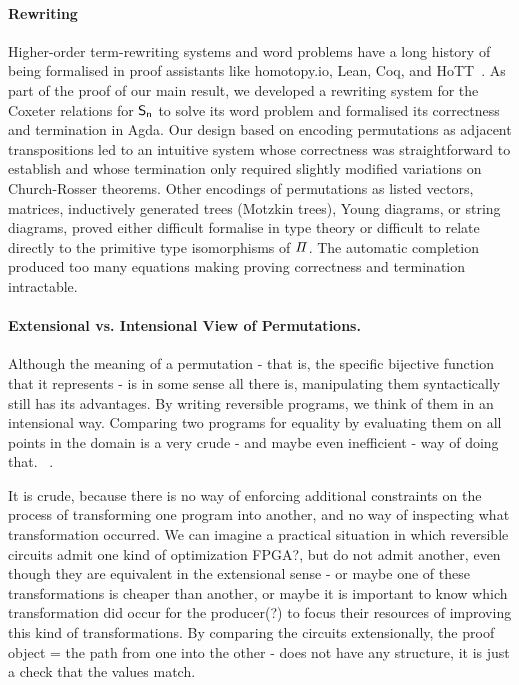 \paragraph{Rewriting} Higher-order term-rewriting systems and word problems have a long history of being formalised in
proof assistants like {homotopy.io}, Lean, Coq, and HoTT~\cite{krausCoherenceWellFoundednessTaming2020}. As part of the
proof of our main result, we developed a rewriting system for the Coxeter relations for $\Sn$ to solve its word problem
and formalised its correctness and termination in Agda. Our design based on encoding permutations as
adjacent transpositions led to an intuitive system whose correctness was straightforward to establish and whose termination
only required slightly modified variations on Church-Rosser theorems. Other encodings of permutations as listed vectors,
matrices, inductively generated trees (Motzkin trees), Young diagrams, or string diagrams, proved either difficult
formalise in type theory or difficult to relate directly to the primitive type isomorphisms of $\mathit{\Pi}$. The automatic
\citet{knuthSimpleWordProblems1970} completion produced too many equations making proving correctness and termination
intractable.

\paragraph{Extensional vs. Intensional View of Permutations.}
Although the meaning of a permutation - that is, the specific bijective function
that it represents - is in some sense all there is, manipulating them
syntactically still has its advantages. By writing reversible programs, we think
of them in an intensional way. Comparing two programs for equality by evaluating
them on all points in the domain is a very crude - and maybe even inefficient -
way of doing that. ~\cite{Kuehlmann:2006:RBR:2298470.2300327,10.1007/978-3-540-24605-3_4,Yamashita:2010:FEQ:1835957.1835965}.

It is crude, because there is no way of enforcing additional constraints on the
process of transforming one program into another, and no way of inspecting what
transformation occurred. We can imagine a practical situation in which reversible
circuits admit one kind of optimization FPGA?, but do not admit another,
even though they are equivalent in the extensional sense - or maybe one of these
transformations is cheaper than another, or maybe it is important to know which
transformation did occur for the producer(?) to focus their resources of
improving this kind of transformations. By comparing the circuits extensionally,
the proof object = the path from one into the other - does not have any
structure,  it is just a check that the values match.

